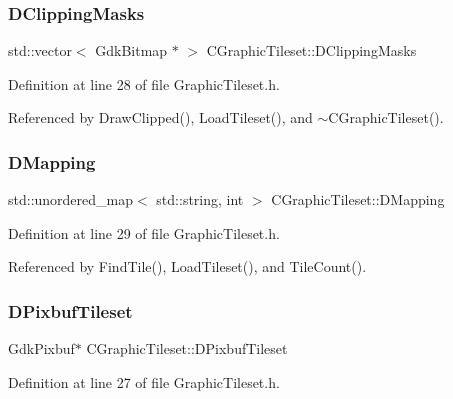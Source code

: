 \subsubsection{\texorpdfstring{D\+Clipping\+Masks}{DClippingMasks}}
{\footnotesize\ttfamily std\+::vector$<$ Gdk\+Bitmap $\ast$ $>$ C\+Graphic\+Tileset\+::\+D\+Clipping\+Masks\hspace{0.3cm}{\ttfamily [protected]}}



Definition at line 28 of file Graphic\+Tileset.\+h.



Referenced by Draw\+Clipped(), Load\+Tileset(), and $\sim$\+C\+Graphic\+Tileset().

\hypertarget{classCGraphicTileset_a17cd13f68f77ea4976b59b37b10e914b}{}\label{classCGraphicTileset_a17cd13f68f77ea4976b59b37b10e914b} 
\subsubsection{\texorpdfstring{D\+Mapping}{DMapping}}
{\footnotesize\ttfamily std\+::unordered\+\_\+map$<$ std\+::string, int $>$ C\+Graphic\+Tileset\+::\+D\+Mapping\hspace{0.3cm}{\ttfamily [protected]}}



Definition at line 29 of file Graphic\+Tileset.\+h.



Referenced by Find\+Tile(), Load\+Tileset(), and Tile\+Count().

\hypertarget{classCGraphicTileset_a5d5adfcdbb347a6df3f57535ca08e3ef}{}\label{classCGraphicTileset_a5d5adfcdbb347a6df3f57535ca08e3ef} 
\subsubsection{\texorpdfstring{D\+Pixbuf\+Tileset}{DPixbufTileset}}
{\footnotesize\ttfamily Gdk\+Pixbuf$\ast$ C\+Graphic\+Tileset\+::\+D\+Pixbuf\+Tileset\hspace{0.3cm}{\ttfamily [protected]}}



Definition at line 27 of file Graphic\+Tileset.\+h.



